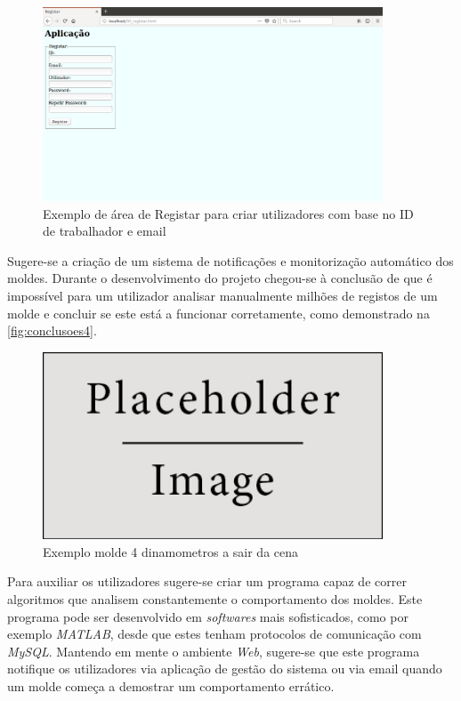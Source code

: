\documentclass[11pt,twoside,a4paper]{report}
\begin{document}
\begin{figure}[H]
	\begin{center}
		\includegraphics[width=0.9\textwidth]{futuro02} %
		\caption{Exemplo de área de Registar para criar utilizadores com base no ID de trabalhador e email}
		\label{fig:conclusoes2}
	\end{center}
\end{figure}
Sugere-se a criação de um sistema de notificações e monitorização automático dos moldes. Durante o desenvolvimento do projeto chegou-se à conclusão de que é impossível para um utilizador analisar manualmente milhões de registos de um molde e concluir se este está a funcionar corretamente, como demonstrado na \autoref{fig:conclusoes4}.
\begin{figure}[H]
	\begin{center}
		\includegraphics[width=0.9\textwidth]{placeholder} %
		\caption{Exemplo molde 4 dinamometros a sair da cena}
		\label{fig:conclusoes4}
	\end{center}
\end{figure}
Para auxiliar os utilizadores sugere-se criar um programa capaz de correr algoritmos que analisem constantemente o comportamento dos moldes. Este programa pode ser desenvolvido em \textit{softwares} mais sofisticados, como por exemplo \textit{MATLAB}, desde que estes tenham protocolos de comunicação com \textit{MySQL}. Mantendo em mente o ambiente \textit{Web}, sugere-se que este programa notifique os utilizadores via aplicação de gestão do sistema ou via email quando um molde começa a demostrar um comportamento errático.
\end{document}
